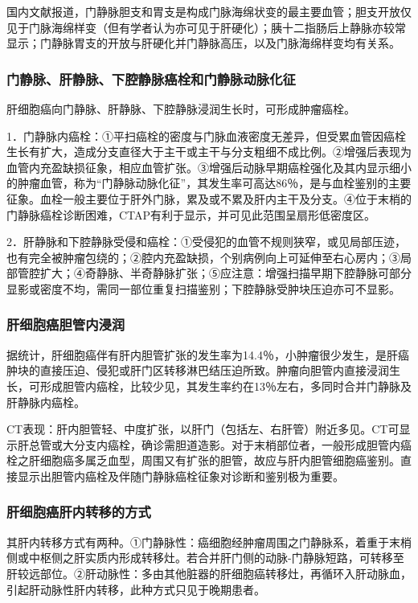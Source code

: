 国内文献报道，门静脉胆支和胃支是构成门脉海绵状变的最主要血管；胆支开放仅见于门脉海绵样变（但有学者认为亦可见于肝硬化）；胰十二指肠后上静脉亦较常显示；门静脉胃支的开放与肝硬化并门静脉高压，以及门脉海绵样变均有关系。

\subsubsection{门静脉、肝静脉、下腔静脉癌栓和门静脉动脉化征}

肝细胞癌向门静脉、肝静脉、下腔静脉浸润生长时，可形成肿瘤癌栓。

1．门静脉内癌栓：①平扫癌栓的密度与门脉血液密度无差异，但受累血管因癌栓生长有扩大，造成分支直径大于主干或主干与分支粗细不成比例。②增强后表现为血管内充盈缺损征象，相应血管扩张。③增强后动脉早期癌栓强化及其内显示细小的肿瘤血管，称为“门静脉动脉化征”，其发生率可高达86％，是与血栓鉴别的主要征象。血栓一般主要位于肝外门脉，累及或不累及肝内主干及分支。④位于末梢的门静脉癌栓诊断困难，CTAP有利于显示，并可见此范围呈扇形低密度区。

2．肝静脉和下腔静脉受侵和癌栓：①受侵犯的血管不规则狭窄，或见局部压迹，也有完全被肿瘤包绕的；②腔内充盈缺损，个别病例向上可延伸至右心房内；③局部管腔扩大；④奇静脉、半奇静脉扩张；⑤应注意：增强扫描早期下腔静脉可部分显影或密度不均，需同一部位重复扫描鉴别；下腔静脉受肿块压迫亦可不显影。

\subsubsection{肝细胞癌胆管内浸润}

据统计，肝细胞癌伴有肝内胆管扩张的发生率为14.4％，小肿瘤很少发生，是肝癌肿块的直接压迫、侵犯或肝门区转移淋巴结压迫所致。肿瘤向胆管内直接浸润生长，可形成胆管内癌栓，比较少见，其发生率约在13％左右，多同时合并门静脉及肝静脉内癌栓。

CT表现：肝内胆管轻、中度扩张，以肝门（包括左、右肝管）附近多见。CT可显示肝总管或大分支内癌栓，确诊需胆道造影。对于末梢部位者，一般形成胆管内癌栓之肝细胞癌多属乏血型，周围又有扩张的胆管，故应与肝内胆管细胞癌鉴别。直接显示出胆管内癌栓及伴随门静脉癌栓征象对诊断和鉴别极为重要。

\subsubsection{肝细胞癌肝内转移的方式}

其肝内转移方式有两种。①门静脉性：癌细胞经肿瘤周围之门静脉系，着重于末梢侧或中枢侧之肝实质内形成转移灶。若合并肝门侧的动脉-门静脉短路，可转移至肝较远部位。②肝动脉性：多由其他脏器的肝细胞癌转移灶，再循环入肝动脉血，引起肝动脉性肝内转移，此种方式只见于晚期患者。

